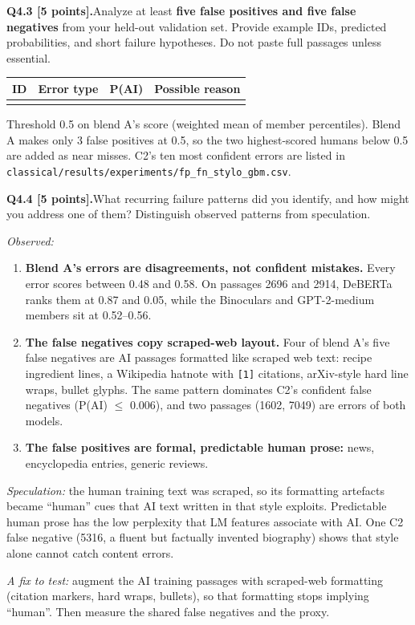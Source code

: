 \documentclass[11pt,letterpaper]{article}
\newcommand{\question}[2]{\needspace{4\baselineskip}\par\addvspace{0.45em}\noindent\textbf{#1}\quad #2\par\nobreak\vspace{0.1em}}
\newcommand{\smallnote}[1]{{\small\color{muted}#1}}
\begin{document}
\question{Q4.3 [5 points].}{Analyze at least \textbf{five false positives and five false negatives} from your held-out validation set. Provide example IDs, predicted probabilities, and short failure hypotheses. Do not paste full passages unless essential.}
{\small\begin{tabularx}{\linewidth}{@{}p{0.5in}p{0.82in}p{0.42in}Y@{}}\toprule ID & Error type & P(AI) & Possible reason \\ \midrule
{}
\bottomrule\end{tabularx}}
\smallnote{Threshold 0.5 on blend A's score (weighted mean of member percentiles). Blend A makes only 3 false positives at 0.5, so the two highest-scored humans below 0.5 are added as near misses. C2's ten most confident errors are listed in \texttt{classical/results/experiments/fp\_fn\_stylo\_gbm.csv}.}

\question{Q4.4 [5 points].}{What recurring failure patterns did you identify, and how might you address one of them? Distinguish observed patterns from speculation.}
\textit{Observed:}
\begin{enumerate}
\item \textbf{Blend A's errors are disagreements, not confident mistakes.} Every error scores between 0.48 and 0.58. On passages 2696 and 2914, DeBERTa ranks them at 0.87 and 0.05, while the Binoculars and GPT-2-medium members sit at 0.52--0.56.
\item \textbf{The false negatives copy scraped-web layout.} Four of blend A's five false negatives are AI passages formatted like scraped web text: recipe ingredient lines, a Wikipedia hatnote with \texttt{[1]} citations, arXiv-style hard line wraps, bullet glyphs. The same pattern dominates C2's confident false negatives (P(AI) $\le$ 0.006), and two passages (1602, 7049) are errors of both models.
\item \textbf{The false positives are formal, predictable human prose:} news, encyclopedia entries, generic reviews.
\end{enumerate}

\textit{Speculation:} the human training text was scraped, so its formatting artefacts became ``human'' cues that AI text written in that style exploits. Predictable human prose has the low perplexity that LM features associate with AI. One C2 false negative (5316, a fluent but factually invented biography) shows that style alone cannot catch content errors.

\textit{A fix to test:} augment the AI training passages with scraped-web formatting (citation markers, hard wraps, bullets), so that formatting stops implying ``human''. Then measure the shared false negatives and the proxy.
\end{document}
